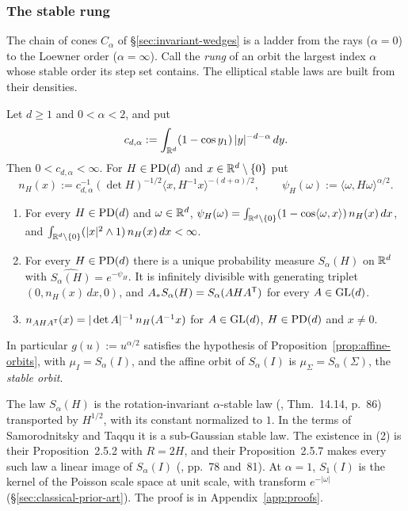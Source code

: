 \subsubsection*{The stable rung}

The chain of cones $C_\alpha$ of \S\ref{sec:invariant-wedges} is a ladder from the rays ($\alpha = 0$)
to the Loewner order ($\alpha = \infty$). Call the \emph{rung} of an orbit the largest index $\alpha$
whose stable order its step set contains. The elliptical stable laws are built from their \Levy{}
densities.

\begin{lemma}\label{lem:elliptical-stable}
Let $d \ge 1$ and $0 < \alpha < 2$, and put
\[
  c_{d,\alpha} := \int_{\mathbb{R}^d}(1 - \cos y_1)\,|y|^{-d-\alpha}\,dy .
\]
Then $0 < c_{d,\alpha} < \infty$. For $H \in \mathrm{PD}(d)$ and $x \in \mathbb{R}^d \setminus \{0\}$ put
\begin{equation}\label{eq:stable-levy-density}
  n_H(x) := c_{d,\alpha}^{-1}(\det H)^{-1/2}\langle x,H^{-1}x\rangle^{-(d+\alpha)/2} ,
  \qquad \psi_H(\omega) := \langle\omega,H\omega\rangle^{\alpha/2} .
\end{equation}
\begin{enumerate}
\item For every $H \in \mathrm{PD}(d)$ and $\omega \in \mathbb{R}^d$,
$\psi_H(\omega) = \int_{\mathbb{R}^d\setminus\{0\}}(1 - \cos\langle\omega,x\rangle)\,n_H(x)\,dx$, and
$\int_{\mathbb{R}^d\setminus\{0\}}(|x|^2 \wedge 1)\,n_H(x)\,dx < \infty$.
\item For every $H \in \mathrm{PD}(d)$ there is a unique probability measure $S_\alpha(H)$ on $\mathbb{R}^d$ with
$\widehat{S_\alpha(H)} = e^{-\psi_H}$. It is infinitely divisible with generating triplet
$(0, n_H(x)\,dx, 0)$, and $A_*S_\alpha(H) = S_\alpha(AHA^{\mathsf{T}})$ for every $A \in \mathrm{GL}(d)$.
\item $n_{AHA^{\mathsf{T}}}(x) = |\det A|^{-1}\,n_H(A^{-1}x)$ for $A \in \mathrm{GL}(d)$, $H \in \mathrm{PD}(d)$ and
$x \ne 0$.
\end{enumerate}
In particular $g(u) := u^{\alpha/2}$ satisfies the hypothesis of Proposition~\ref{prop:affine-orbits}, with
$\mu_I = S_\alpha(I)$, and the affine orbit of $S_\alpha(I)$ is $\mu_\Sigma = S_\alpha(\Sigma)$, the
\emph{stable orbit}.
\end{lemma}

The law $S_\alpha(H)$ is the rotation-invariant $\alpha$-stable law (, Thm.~14.14,
p.~86) transported by $H^{1/2}$, with its constant normalized to $1$. In the terms of Samorodnitsky
and Taqqu it is a sub-Gaussian stable law. The existence in (2) is their Proposition~2.5.2 with
$R = 2H$, and their Proposition~2.5.7 makes every such law a linear image of $S_\alpha(I)$
(, pp.~78 and~81). At $\alpha = 1$, $S_1(I)$ is the kernel of the Poisson scale
space at unit scale, with transform $e^{-|\omega|}$ (\S\ref{sec:classical-prior-art}). The proof is in
Appendix~\ref{app:proofs}.

